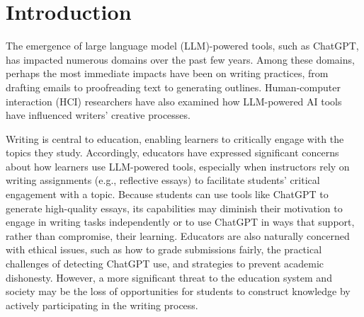 \documentclass[manuscript,screen,acmsmall]{acmart}
\begin{document}



\maketitle

\section{Introduction}


The emergence of large language model (LLM)-powered tools, such as ChatGPT, has impacted numerous domains over the past few years.
Among these domains, perhaps the most immediate impacts have been on writing practices, from drafting emails to proofreading text to generating outlines.
Human-computer interaction (HCI) researchers have also examined how LLM-powered AI tools have influenced writers' creative processes.

    
    Writing is central to education, enabling learners to critically engage with the topics they study. Accordingly, educators have expressed significant concerns about how learners use LLM-powered tools, especially when instructors rely on writing assignments (e.g., reflective essays) to facilitate students' critical engagement with a topic.
Because students can use tools like ChatGPT to generate high-quality essays, its capabilities may diminish their motivation to engage in writing tasks independently or to use ChatGPT in ways that support, rather than compromise, their learning.
Educators are also naturally concerned with ethical issues, such as how to grade submissions fairly, the practical challenges of detecting ChatGPT use, and strategies to prevent academic dishonesty. However, a more significant threat to the education system and society may be the loss of opportunities for students to construct knowledge by actively participating in the writing process.
    
\end{document}
